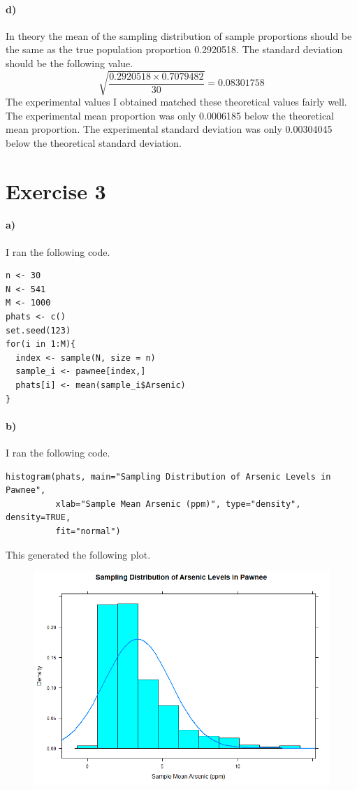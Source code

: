 \documentclass[12pt]{article}
\begin{document}
\paragraph{d)}

In theory the mean of the sampling distribution of sample proportions should be the
same as the true population proportion 0.2920518. The standard deviation should
be the following value.
\[\sqrt{\frac{0.2920518\times0.7079482}{30}}=0.08301758\]
The experimental values I obtained matched these theoretical values fairly well.
The experimental mean proportion was only 0.0006185 below the theoretical mean proportion.
The experimental standard deviation was only 0.00304045 below the theoretical standard
deviation.

\section*{Exercise 3}

\paragraph{a)}

I ran the following code.
\begin{verbatim}
n <- 30
N <- 541
M <- 1000
phats <- c()
set.seed(123)
for(i in 1:M){
  index <- sample(N, size = n)
  sample_i <- pawnee[index,]
  phats[i] <- mean(sample_i$Arsenic)
}
\end{verbatim}

\paragraph{b)}

I ran the following code.
\scriptsize
\begin{verbatim}
histogram(phats, main="Sampling Distribution of Arsenic Levels in Pawnee",
          xlab="Sample Mean Arsenic (ppm)", type="density", density=TRUE,
          fit="normal")
\end{verbatim}
\normalsize
This generated the following plot.
\begin{figure}[H]
    \begin{center}
        \includegraphics[width=4.5in]{exercise3a.png}
    \end{center}
\end{figure}
\end{document}
